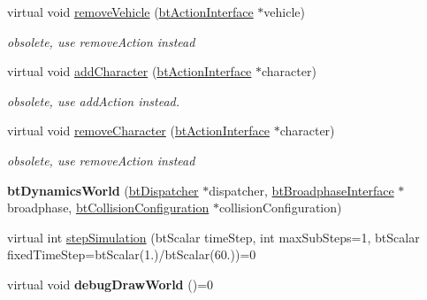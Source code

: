 \begin{DoxyCompactItemize}
\mbox{\label{classbtDynamicsWorld_abb361ed4e22766cd79d22ece3f5869e6}} 
virtual void \hyperlink{classbtDynamicsWorld_abb361ed4e22766cd79d22ece3f5869e6}{remove\+Vehicle} (\hyperlink{classbtActionInterface}{bt\+Action\+Interface} $\ast$vehicle)
\begin{DoxyCompactList}\small\item\em obsolete, use remove\+Action instead \end{DoxyCompactList}\item 
\mbox{\label{classbtDynamicsWorld_a56e16159fdff1311706d4b73e0999e02}} 
virtual void \hyperlink{classbtDynamicsWorld_a56e16159fdff1311706d4b73e0999e02}{add\+Character} (\hyperlink{classbtActionInterface}{bt\+Action\+Interface} $\ast$character)
\begin{DoxyCompactList}\small\item\em obsolete, use add\+Action instead. \end{DoxyCompactList}\item 
\mbox{\label{classbtDynamicsWorld_ae4daeac0b98e39a80bb960c5b995fd2a}} 
virtual void \hyperlink{classbtDynamicsWorld_ae4daeac0b98e39a80bb960c5b995fd2a}{remove\+Character} (\hyperlink{classbtActionInterface}{bt\+Action\+Interface} $\ast$character)
\begin{DoxyCompactList}\small\item\em obsolete, use remove\+Action instead \end{DoxyCompactList}\item 
\mbox{\label{classbtDynamicsWorld_ade9becb7e4f919d56a8c261baf560896}} 
{\bfseries bt\+Dynamics\+World} (\hyperlink{classbtDispatcher}{bt\+Dispatcher} $\ast$dispatcher, \hyperlink{classbtBroadphaseInterface}{bt\+Broadphase\+Interface} $\ast$broadphase, \hyperlink{classbtCollisionConfiguration}{bt\+Collision\+Configuration} $\ast$collision\+Configuration)
\item 
virtual int \hyperlink{classbtDynamicsWorld_a5ab26a0d6e8b2b21fbde2ed8f8dd6294}{step\+Simulation} (bt\+Scalar time\+Step, int max\+Sub\+Steps=1, bt\+Scalar fixed\+Time\+Step=bt\+Scalar(1.)/bt\+Scalar(60.))=0
\item 
\mbox{\label{classbtDynamicsWorld_a392b087f91a91a9b46a63ac790f72b80}} 
virtual void {\bfseries debug\+Draw\+World} ()=0

\end{DoxyCompactItemize}
